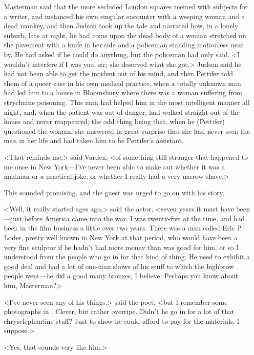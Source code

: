 Masterman said that the more secluded London squares teemed with subjects for a writer, and instanced his own singular encounter with a weeping woman and a dead monkey, and then Judson took up the tale and narrated how, in a lonely suburb, late at night, he had come upon the dead body of a woman stretched on the pavement with a knife in her side and a policeman standing motionless near by. He had asked if he could do anything, but the policeman had only said, <I wouldn't interfere if I was you, sir; she deserved what she got.> Judson said he had not been able to get the incident out of his mind, and then Pettifer told them of a queer case in his own medical practice, when a totally unknown man had led him to a house in Bloomsbury where there was a woman suffering from strychnine poisoning. This man had helped him in the most intelligent manner all night, and, when the patient was out of danger, had walked straight out of the house and never reappeared; the odd thing being that, when he (Pettifer) questioned the woman, she answered in great surprise that she had never seen the man in her life and had taken him to be Pettifer's assistant.

<That reminds me,> said Varden, <of something still stranger that happened to me once in New York—I've never been able to make out whether it was a madman or a practical joke, or whether I really had a very narrow shave.>

This sounded promising, and the guest was urged to go on with his story.

<Well, it really started ages ago,> said the actor, <seven years it must have been—just before America came into the war. I was twenty-five at the time, and had been in the film business a little over two years. There was a man called Eric P\@. Loder, pretty well known in New York at that period, who would have been a very fine sculptor if he hadn't had more money than was good for him, or so I understood from the people who go in for that kind of thing. He used to exhibit a good deal and had a lot of one-man shows of his stuff to which the highbrow people went—he did a good many bronzes, I believe. Perhaps you know about him, Masterman?>

<I've never seen any of his things,> said the poet, <but I remember some photographs in . Clever, but rather overripe. Didn't he go in for a lot of that chryselephantine stuff? Just to show he could afford to pay for the materials, I suppose.>

<Yes, that sounds very like him.>

